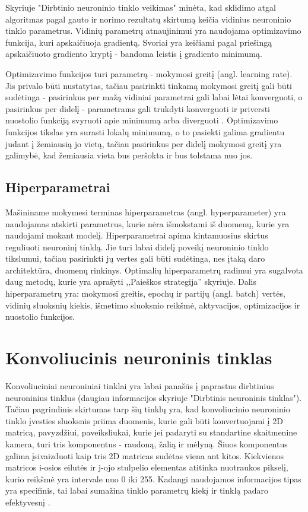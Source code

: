 \documentclass{VUMIFPSbakalaurinis}
\begin{document}
Skyriuje "Dirbtinio neuroninio tinklo veikimas" minėta, kad sklidimo atgal algoritmas pagal gauto ir norimo 
rezultatų skirtumą keičia vidinius neuroninio tinklo parametrus. Vidinių parametrų atnaujinimui yra naudojama 
optimizavimo funkcija, kuri apskaičiuoja gradientą. Svoriai yra keičiami pagal priešingą apskaičiuoto gradiento 
kryptį - bandoma leistis į gradiento minimumą.

Optimizavimo funkcijos turi parametrą - mokymosi greitį (angl. learning rate). Jis privalo būti nustatytas, tačiau 
pasirinkti tinkamą mokymosi greitį gali būti sudėtinga - pasirinkus per mažą vidiniai parametrai gali labai lėtai 
konverguoti, o pasirinkus per didelį - parametrams gali trukdyti konverguoti ir priversti nuostolio funkciją svyruoti
apie minimumą arba diverguoti \cite{leondes1998image}. Optimizavimo funkcijos tikslas yra surasti lokalų minimumą, 
o to pasiekti galima gradientu judant į žemiausią jo vietą, tačiau pasirinkus per didelį mokymosi greitį yra galimybė, 
kad žemiausia vieta bus peršokta ir bus tolstama nuo jos.

\subsection{Hiperparametrai}

Mašininame mokymesi terminas hiperparametras (angl. hyperparameter) yra naudojamas atskirti parametrus, kurie nėra išmokstami iš duomenų, kurie yra naudojami mokant modelį. Hiperparametrai apima kintamuosius skirtus reguliuoti neuroninį tinklą. Jie turi labai didelį poveikį neuroninio tinklo tikslumui, tačiau pasirinkti jų vertes gali būti sudėtinga, nes įtaką daro architektūra, duomenų rinkinys. Optimalių hiperparametrų radimui yra sugalvota daug metodų, kurie yra aprašyti ,,Paieškos strategija'' skyriuje. 
Dalis hiperparametrų yra: mokymosi greitis, epochų ir partijų (angl. batch) vertės, vidinių sluoksnių kiekis, išmetimo sluoksnio reikšmė, aktyvacijos, optimizacijos ir nuostolio funkcijos. 

\section{Konvoliucinis neuroninis tinklas}
Konvoliuciniai neuroniniai tinklai yra labai panašūs į paprastus dirbtinius neuroninius tinklus (daugiau informacijos skyriuje "Dirbtinis neuroninis
tinklas"). Tačiau pagrindinis skirtumas tarp šių tinklų yra, kad konvoliucinio neuroninio tinklo įvesties sluoksnis priima duomenis, kurie gali būti konvertuojami į 2D matricą, pavyzdžiui, paveiksliukai, 
kurie jei padaryti su standartine skaitmenine kamera, turi tris komponentus - raudoną, žalią ir mėlyną. Šiuos komponentus galima 
įsivaizduoti kaip tris 2D matricas sudėtas viena ant kitos. Kiekvienos matricos i-osios eilutės ir j-ojo stulpelio elementas 
atitinka nuotraukos pikselį, kurio reikšmė yra intervale nuo 0 iki 255. Kadangi naudojamos informacijos tipas yra specifinis, 
tai labai sumažina tinklo parametrų kiekį ir tinklą padaro efektyvesnį \cite{CnnImages}.
\end{document}

